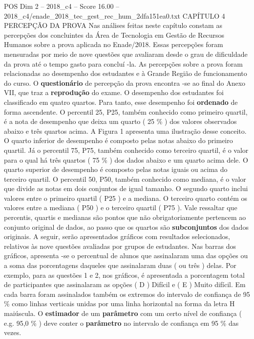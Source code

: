 \begin{textsample}{POS Dim 2 – 2018\_c4 – Score 16.00 – 2018\_c4/enade\_2018\_tec\_gest\_rec\_hum\_2dfa151ea0.txt}  \label{ex:f2_pos_057}
CAPÍTULO 4 PERCEPÇÃO DA PROVA Nas análises feitas neste capítulo constam as percepções dos concluintes da Área de Tecnologia em Gestão de Recursos Humanos sobre a prova aplicada no Enade/2018.
Essas percepções foram mensuradas por meio de nove questões que avaliaram desde o grau de dificuldade da prova até o tempo gasto para concluí -la.
As percepções sobre a prova foram relacionadas ao desempenho dos estudantes e à Grande Região de funcionamento do curso.
O \textbf{questionário} de percepção da prova encontra -se ao final do Anexo VII, que traz a \textbf{reprodução} do exame.
O desempenho dos estudantes foi classificado em quatro quartos.
Para tanto, esse desempenho foi \textbf{ordenado} de forma ascendente.
O percentil 25, P25, também conhecido como primeiro quartil, é a nota de desempenho que deixa um quarto ( 25 \% ) dos valores observados abaixo e três quartos acima.
A Figura 1 apresenta uma ilustração desse conceito.
O quarto inferior de desempenho é composto pelas notas abaixo do primeiro quartil.
Já o percentil 75, P75, também conhecido como terceiro quartil, é o valor para o qual há três quartos ( 75 \% ) dos dados abaixo e um quarto acima dele.
O quarto superior de desempenho é composto pelas notas iguais ou acima do terceiro quartil.
O percentil 50, P50, também conhecido como mediana, é o valor que divide as notas em dois conjuntos de igual tamanho.
O segundo quarto inclui valores entre o primeiro quartil ( P25 ) e a mediana.
O terceiro quarto contém os valores entre a mediana ( P50 ) e o terceiro quartil ( P75 ).
Vale ressaltar que percentis, quartis e medianas são pontos que não obrigatoriamente pertencem ao conjunto original de dados, ao passo que os quartos são \textbf{subconjuntos} dos dados originais.
A seguir, serão apresentados gráficos com resultados selecionados, relativos às nove questões avaliadas por grupos de estudantes.
Nas barras dos gráficos, apresenta -se o percentual de alunos que assinalaram uma das opções ou a soma das porcentagens daqueles que assinalaram duas ( ou três ) delas.
Por exemplo, para as questões 1 e 2, nos gráficos, é apresentada a porcentagem total de participantes que assinalaram as opções ( D ) Difícil e ( E ) Muito difícil.
Em cada barra foram assinalados também os extremos do intervalo de confiança de 95 \% como linhas verticais unidas por uma linha horizontal na forma da letra H maiúscula.
O \textbf{estimador} de um \textbf{parâmetro} com um certo nível de confiança ( e.g. 95,0 \% ) deve conter o \textbf{parâmetro} no intervalo de confiança em 95 \% das vezes.

\end{textsample}
